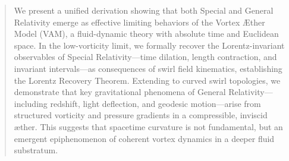 \documentclass[12pt]{article}
\begin{document}
    \titlepageOpen


    \begin{abstract}
        We present a unified derivation showing that both Special and General Relativity emerge as effective limiting behaviors of the Vortex Æther Model (VAM), a fluid-dynamic theory with absolute time and Euclidean space. In the low-vorticity limit, we formally recover the Lorentz-invariant observables of Special Relativity—time dilation, length contraction, and invariant intervals—as consequences of swirl field kinematics, establishing the Lorentz Recovery Theorem. Extending to curved swirl topologies, we demonstrate that key gravitational phenomena of General Relativity—including redshift, light deflection, and geodesic motion—arise from structured vorticity and pressure gradients in a compressible, inviscid æther. This suggests that spacetime curvature is not fundamental, but an emergent epiphenomenon of coherent vortex dynamics in a deeper fluid substratum.
    \end{abstract}
\end{document}
